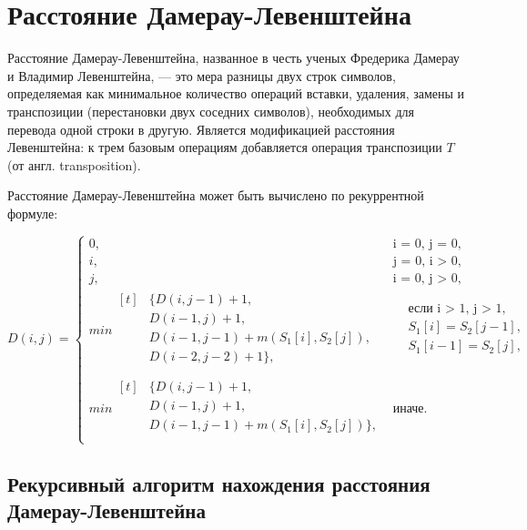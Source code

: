 \section{Расстояние Дамерау-Левенштейна}
Расстояние Дамерау-Левенштейна, названное в честь ученых Фредерика Дамерау и Владимир Левенштейна, --- это мера разницы двух строк символов, определяемая как минимальное количество операций вставки, удаления, замены и транспозиции (перестановки двух соседних символов), необходимых для перевода одной строки в другую. Является модификацией расстояния Левенштейна: к трем базовым операциям добавляется операция транспозиции $T$ (от англ. transposition).

Расстояние Дамерау-Левенштейна может быть вычислено по рекуррентной формуле:

\begin{equation}
	\label{eq:DL}
	D(i, j) =
	\begin{cases}
		0, &\text{i = 0, j = 0,}\\
		i, &\text{j = 0, i > 0,}\\
		j, &\text{i = 0, j > 0,}\\
		min\!\begin{aligned}[t]&\{D(i, j - 1) + 1,\\
			&D(i - 1, j) + 1,\\
			&D(i - 1, j - 1) + m(S_{1}[i], S_{2}[j]), \\
			&D(i - 2, j - 2) + 1\}, \\
		\end{aligned}
		& \begin{aligned}
			& \text{если i > 1, j > 1}, \\
			& S_{1}[i] = S_{2}[j - 1], \\
			& S_{1}[i - 1] = S_{2}[j], \\
		\end{aligned}\\
		min \!\begin{aligned}[t]&\{D(i, j - 1) + 1,\\
			&D(i - 1, j) + 1, \\
			&D(i - 1, j - 1) + m(S_{1}[i], S_{2}[j])\}, \\
		\end{aligned}
		 & \text{иначе.}
	\end{cases}
\end{equation}

\subsection{Рекурсивный алгоритм нахождения расстояния Дамерау-Левенштейна}

